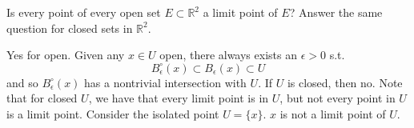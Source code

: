 \documentclass{article}
\begin{document}
    \begin{exercise}[Rudin 2.8]
    Is every point of every open set $E \subset \mathbb{R}^2$ a limit point of $E$? Answer the same question for closed sets in $\mathbb{R}^2$. 
    \end{exercise}
    \begin{solution}
    Yes for open. Given any $x \in U$ open, there always exists an $\epsilon > 0$ s.t. 
    \[B_\epsilon^\circ (x) \subset B_\epsilon (x) \subset U\]
    and so $B_\epsilon^\circ (x)$ has a nontrivial intersection with $U$. If $U$ is closed, then no. Note that for closed $U$, we have that every limit point is in $U$, but not every point in $U$ is a limit point. Consider the isolated point $U = \{x\}$. $x$ is not a limit point of $U$. 
    \end{solution}
\end{document}
